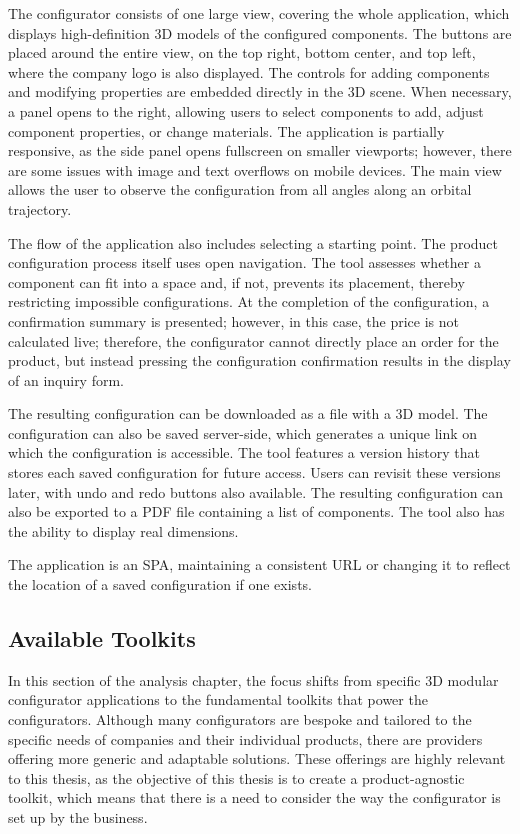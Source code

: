 The configurator consists of one large view, covering the whole application, which displays high-definition 3D models of the configured components. The buttons are placed around the entire view, on the top right, bottom center, and top left, where the company logo is also displayed.  The controls for adding components and modifying properties are embedded directly in the 3D scene. When necessary, a panel opens to the right, allowing users to select components to add, adjust component properties, or change materials. The application is partially responsive, as the side panel opens fullscreen on smaller viewports; however, there are some issues with image and text overflows on mobile devices. The main view allows the user to observe the configuration from all angles along an orbital trajectory.

The flow of the application also includes selecting a starting point. The product configuration process itself uses open navigation. The tool assesses whether a component can fit into a space and, if not, prevents its placement, thereby restricting impossible configurations. At the completion of the configuration, a confirmation summary is presented; however, in this case, the price is not calculated live; therefore, the configurator cannot directly place an order for the product, but instead pressing the configuration confirmation results in the display of an inquiry form.

The resulting configuration can be downloaded as a file with a 3D model. The configuration can also be saved server-side, which generates a unique link on which the configuration is accessible. The tool features a version history that stores each saved configuration for future access. Users can revisit these versions later, with undo and redo buttons also available. The resulting configuration can also be exported to a PDF file containing a list of components. The tool also has the ability to display real dimensions.

The application is an SPA, maintaining a consistent URL or changing it to reflect the location of a saved configuration if one exists.


\subsection{Available Toolkits}

In this section of the analysis chapter, the focus shifts from specific 3D modular configurator applications to the fundamental toolkits that power the configurators. Although many configurators are bespoke and tailored to the specific needs of companies and their individual products, there are providers offering more generic and adaptable solutions. These offerings are highly relevant to this thesis, as the objective of this thesis is to create a product-agnostic toolkit, which means that there is a need to consider the way the configurator is set up by the business.

